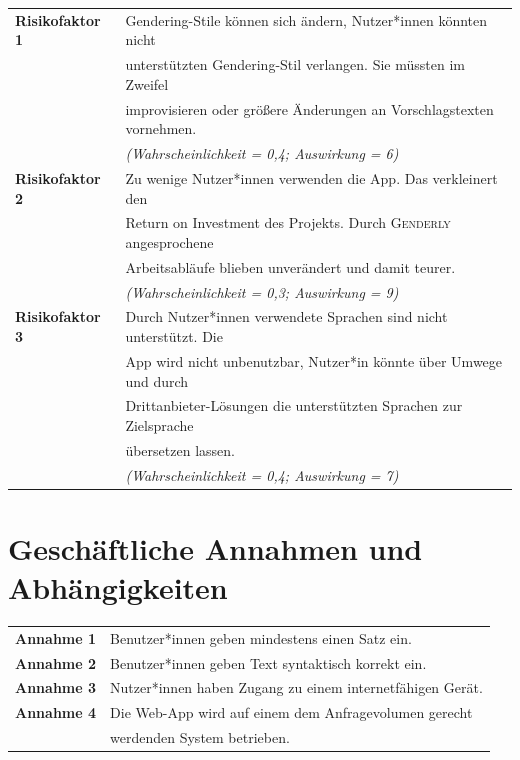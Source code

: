 \documentclass[paper=a4, parskip=half]{scrreprt}
\begin{document}
\begin{table}[!htb]
\begin{tabular}{ll}
\textbf{Risikofaktor 1} & Gendering-Stile können sich ändern, Nutzer*innen könnten nicht\\
& unterstützten Gendering-Stil verlangen. Sie müssten im Zweifel \\
& improvisieren oder größere Änderungen an Vorschlagstexten vornehmen. \vspace{0.15cm} \\
& \textit{(Wahrscheinlichkeit = 0,4; Auswirkung = 6)} \vspace{0.15cm} \\
\textbf{Risikofaktor 2} & Zu wenige Nutzer*innen verwenden die App. Das verkleinert den\\
 & Return on Investment des Projekts. Durch \textsc{Genderly} angesprochene\\
 & Arbeitsabläufe blieben unverändert und damit teurer.\vspace{0.15cm} \\
 & \textit{(Wahrscheinlichkeit = 0,3; Auswirkung = 9)} \vspace{0.15cm} \\
\textbf{Risikofaktor 3} & Durch Nutzer*innen verwendete Sprachen sind nicht unterstützt. Die\\
 & App wird nicht unbenutzbar, Nutzer*in könnte über Umwege und durch \\
 & Drittanbieter-Lösungen die unterstützten Sprachen zur Zielsprache \\
 & übersetzen lassen. \vspace{0.15cm} \\
 & \textit{(Wahrscheinlichkeit = 0,4; Auswirkung = 7)} \vspace{0.15cm} \\
\end{tabular}
\end{table}

\section{Geschäftliche Annahmen und Abhängigkeiten}

\begin{table}[!htb]
\begin{tabular}{ll}
\textbf{Annahme 1} & Benutzer*innen geben mindestens einen Satz ein. \vspace{0.15cm} \\
\textbf{Annahme 2} & Benutzer*innen geben Text syntaktisch korrekt ein. \vspace{0.15cm}\\
\textbf{Annahme 3} & Nutzer*innen haben Zugang zu einem internetfähigen Gerät. \vspace{0.15cm} \\
\textbf{Annahme 4} & Die Web-App wird auf einem dem Anfragevolumen gerecht \\
& werdenden System betrieben. \vspace{0.15cm} \\
\end{tabular}
\end{table}
\end{document}
